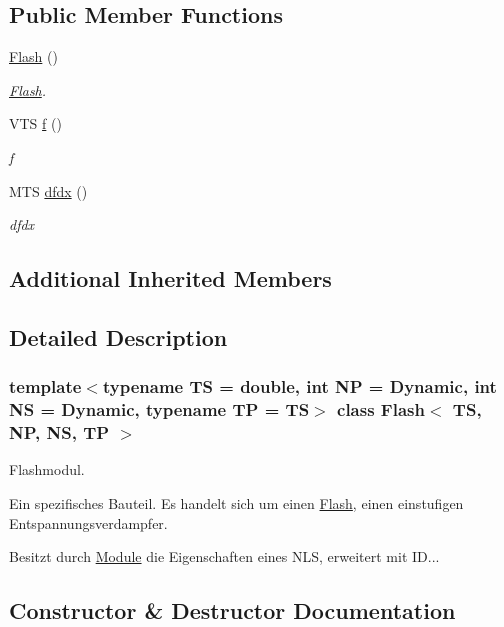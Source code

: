 \subsection*{Public Member Functions}
\begin{DoxyCompactItemize}
\item 
\mbox{\hyperlink{class_flash_a9866fb5b0caeb6241ce7eb481acca661}{Flash}} ()
\begin{DoxyCompactList}\small\item\em \mbox{\hyperlink{class_flash}{Flash}}. \end{DoxyCompactList}\item 
V\+TS \mbox{\hyperlink{class_flash_ad29e755877ca96aa5b9f34a10d6cd8b2}{f}} ()
\begin{DoxyCompactList}\small\item\em f \end{DoxyCompactList}\item 
M\+TS \mbox{\hyperlink{class_flash_a83e35b3ab13b3705f0fe06c40b800a8b}{dfdx}} ()
\begin{DoxyCompactList}\small\item\em dfdx \end{DoxyCompactList}\end{DoxyCompactItemize}
\subsection*{Additional Inherited Members}


\subsection{Detailed Description}
\subsubsection*{template$<$typename TS = double, int NP = Dynamic, int NS = Dynamic, typename TP = TS$>$\newline
class Flash$<$ T\+S, N\+P, N\+S, T\+P $>$}

Flashmodul. 

Ein spezifisches Bauteil. Es handelt sich um einen \mbox{\hyperlink{class_flash}{Flash}}, einen einstufigen Entspannungsverdampfer.

Besitzt durch \mbox{\hyperlink{class_module}{Module}} die Eigenschaften eines N\+LS, erweitert mit ID... 

\subsection{Constructor \& Destructor Documentation}
\mbox{\label{class_flash_a9866fb5b0caeb6241ce7eb481acca661}} 
